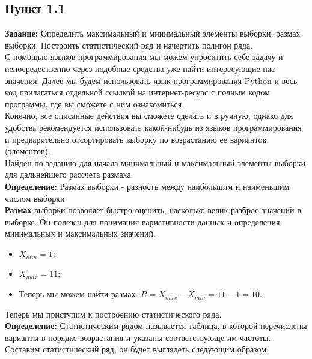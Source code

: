 \documentclass[12pt]{article}
\begin{document}
\subsection*{Пункт 1.1}
\textbf{Задание:} Определить максимальный и минимальный элементы выборки, 
размах выборки. Построить статистический ряд и начертить полигон 
ряда. \\
\vspace{5mm}
С помощью языков программирования мы можем упроситить себе задачу и непосредественно через подобные средства уже найти интересующие нас значения. Далее мы будем использовать язык программирования Python и весь код прилагаться отдельной ссылкой на интернет-ресурс с полным кодом программы, где вы сможете с ним ознакомиться.\\
Конечно, все описанные действия вы сможете сделать и в ручную, однако для удобства рекомендуется использовать какой-нибудь из языков программирования и предварительно отсортировать выборку по возрастанию ее вариантов (элементов).\\
Найден по заданию для начала минимальный и максимальный элементы выборки для дальнейшего рассчета размаха.\\
\vspace{5mm}
\textbf{Определение:} Размах выборки - разность между наибольшим и наименьшим числом выборки.\\
\vspace{5mm}
\textbf{Размах} выборки позволяет быстро оценить, насколько велик разброс значений в выборке. Он полезен для понимания вариативности данных и определения минимальных и максимальных значений.\\
\begin{itemize}
  \item $X_{min} = 1;$
  \item $X_{max} = 11$;
  \item Теперь мы можем найти размах: $R = X_{max} - X_{min} = 11 - 1 = 10$.
\end{itemize}
Теперь мы приступим к построению статистического ряда.\\
\vspace{5mm}
\newpage
\textbf{Определение:} Статистическим рядом называется таблица, в которой перечислены варианты в порядке возрастания и указаны соответствующе им частоты.\\
Составим статистический ряд, он будет выглядеть следующим образом:\\
\vspace{5mm}
\centering
\end{document}
